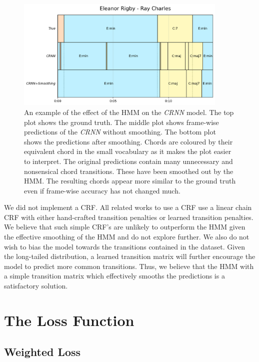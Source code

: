 \begin{figure}[H]
    \centering
    \hspace{-1.5cm}
    \includegraphics[width=0.9\textwidth]{figures/hmm_smoothing_example.png}
    \caption{An example of the effect of the HMM on the \emph{CRNN} model. The top plot shows the ground truth. The middle plot shows frame-wise predictions of the \emph{CRNN} without smoothing. The bottom plot shows the predictions after smoothing. Chords are coloured by their equivalent chord in the small vocabulary as it makes the plot easier to interpret. The original predictions contain many unnecessary and nonsensical chord transitions. These have been smoothed out by the HMM. The resulting chords appear more similar to the ground truth even if frame-wise accuracy has not changed much.}\label{fig:hmm_smoothing_example}
\end{figure}

We did not implement a CRF. All related works to use a CRF use a linear chain CRF with either hand-crafted transition penalties or learned transition penalties. We believe that such simple CRF's are unlikely to outperform the HMM given the effective smoothing of the HMM and do not explore further. We also do not wish to bias the model towards the transitions contained in the dataset. Given the long-tailed distribution, a learned transition matrix will further encourage the model to predict more common transitions. Thus, we believe that the HMM with a simple transition matrix which effectively smooths the predictions is a satisfactory solution.

\section{The Loss Function}

\subsection{Weighted Loss}

